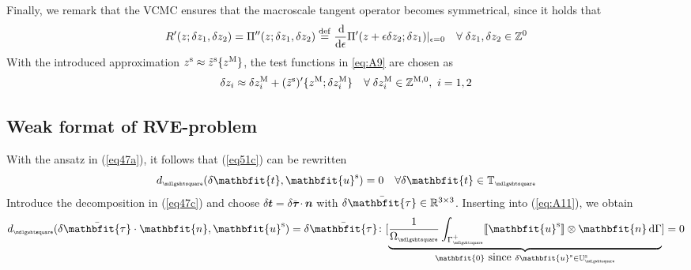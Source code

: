 \documentclass[12pt,a4paper]{article}
\renewcommand{\ta}[1]{\mathbfit{#1}}
\renewcommand{\ts}[1]{\mathbfit{#1}}
\renewcommand{\Box}{\mdlgwhtsquare}
\DeclarePairedDelimiter{\jmp}{[\![}{]\!]}
\newcommand{\rve}{
  {\mathchoice
   {\mbox{\scalebox{0.67}{$\Box$}}}
   {\mbox{\scalebox{0.67}{$\Box$}}}
   {\mbox{\scalebox{0.5}{$\Box$}}}
   {\mbox{\scalebox{0.375}{$\Box$}}}
  }
}
\begin{document}
Finally, we remark that the VCMC ensures that the macroscale tangent operator becomes symmetrical, since it holds that
\begin{align}
\label{eq:A9} R'(z;\delta z_1,\delta z_2) = \Pi''(z;\delta z_1,\delta z_2) \overset{\mathrm{def}}{=} \frac{\operatorname{d \!}}{\operatorname{d \!}\epsilon}\Pi'(z+\epsilon\delta z_2;\delta z_1)|_{\epsilon=0}\quad \forall\;\delta z_1,\delta z_2 \in \mathbb{Z}^0
\end{align}
With the introduced approximation $z^{\mathrm{s}} \approx \tilde{z}^{\mathrm{s}}\{z^{\mathrm{M}}\}$, the test functions in \eqref{eq:A9} are chosen as
\begin{align}
\label{eq:A10} \delta z_i \approx \delta z_i^{\mathrm{M}} + (\tilde{z}^{\mathrm{s}})'\{z^{\mathrm{M}};\delta z_i^{\mathrm{M}}\} \quad \forall\;\delta z_i^{\mathrm{M}}\in\mathbb{Z}^{\mathrm{M},0}, \,\, i=1,2
\end{align}


\subsection{Weak format of RVE-problem}

With the ansatz in (\ref{eq47a}), it follows that (\ref{eq51c}) can be rewritten
\begin{equation}
    d_\rve(\delta\ta{t},\ta{u}^\fluct) = 0
    \quad \forall \delta\ta{t} \in \set{T}_\rve
\label{eq:A11}
\end{equation}
Introduce the decomposition in (\ref{eq47c}) and choose $\delta\ta{t}=\delta\bar{\ts\tau}\cdot\ta{n}$ with $\delta\bar{\ts\tau}\in\set{R}^{3\times3}$.
Inserting into (\ref{eq:A11}), we obtain
\begin{equation}
    d_\rve(\delta\bar{\ts\tau}\cdot\ta{n},\ta{u}^\fluct) = \delta\bar{\ts\tau}\colon [
    \underbrace{\frac{1}{\Omega_\rve}\int_{\Gamma_\rve^+} \jmp{\ta{u}^\fluct}\otimes\ta{n} \dif\Gamma}_{\ta{0} \mbox{ since } \delta\ta{u}^\fluct \in \set{U}_\rve^\fluct} ] = 0
\label{eq:A12}
\end{equation}
\end{document}
